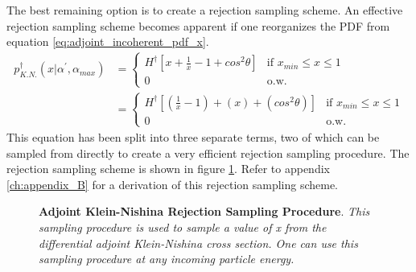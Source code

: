 The best remaining option is to create a rejection sampling scheme. An 
effective rejection sampling scheme becomes apparent if one reorganizes the
PDF from equation \ref{eq:adjoint_incoherent_pdf_x}.
\begin{align}
  p_{K.N.}^{\dagger}(x|\alpha^{'},\alpha_{max}) & = 
  \begin{cases}
    H^{\dagger}\left[x + \frac{1}{x} - 1 + cos^2\theta \right] 
    & \text{if } x_{min} \leq x \leq 1 \\
    0 & \text{o.w.}
  \end{cases} \nonumber \\
  & = 
  \begin{cases}
    H^{\dagger}\left[\left(\frac{1}{x} - 1 \right) + \left(x\right) + 
      \left(cos^2\theta\right) \right] 
    & \text{if } x_{min} \leq x \leq 1 \\
    0 & \text{o.w.}
  \end{cases} \label{eq:reorganized_adjoint_KN_pdf}
\end{align}
This equation has been split into three separate terms, two of which can be 
sampled from directly to create a very efficient rejection sampling procedure.
The rejection sampling scheme is shown in figure 
\ref{fig:adjoint_KN_rejection_sampling}. Refer to appendix \ref{ch:appendix_B}
for a derivation of this rejection sampling scheme.
\begin{figure}[t!]
  \begin{center}
    \def\svgwidth{360bp}
    
  \end{center}
  \caption{\textbf{Adjoint Klein-Nishina Rejection Sampling Procedure}.
    \textit{This sampling procedure is used to sample a value of x from the
    differential adjoint Klein-Nishina cross section. One can use this sampling
    procedure at any incoming particle energy.}}
  \label{fig:adjoint_KN_rejection_sampling}
\end{figure}

